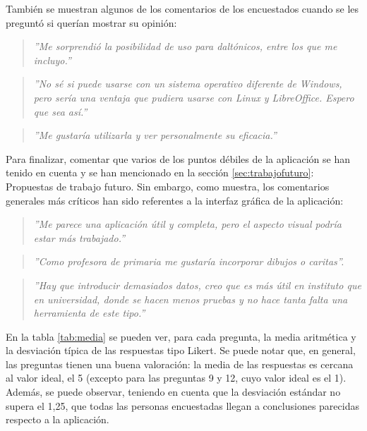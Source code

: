 También se muestran algunos de los comentarios de los encuestados cuando se les preguntó si querían mostrar su opinión:
\begin{quote}
\textit{''Me sorprendió la posibilidad de uso para daltónicos, entre los que me incluyo.''}
\end{quote}

\begin{quote}
\textit{''No sé si puede usarse con un sistema operativo diferente de Windows, pero sería una ventaja que pudiera usarse con Linux y LibreOffice. Espero que sea así.''}
\end{quote}

\begin{quote}
\textit{''Me gustaría utilizarla y ver personalmente su eficacia.''}
\end{quote}

Para finalizar, comentar que varios de los puntos débiles de la aplicación se han tenido en cuenta y se han mencionado en la sección \ref{sec:trabajofuturo}: Propuestas de trabajo futuro. Sin embargo, como muestra, los comentarios generales más críticos han sido referentes a la interfaz gráfica de la aplicación:

\begin{quote}
\textit{''Me parece una aplicación útil y completa, pero el aspecto visual podría estar más trabajado.''}
\end{quote}

\begin{quote}
\textit{''Como profesora de primaria me gustaría incorporar dibujos o caritas''.}
\end{quote}

\begin{quote}
\textit{''Hay que introducir demasiados datos, creo que es más útil en instituto que en universidad, donde se hacen menos pruebas y no hace tanta falta una herramienta de este tipo.''}
\end{quote}

En la tabla \ref{tab:media} se pueden ver, para cada pregunta, la media aritmética y la desviación típica de las respuestas tipo Likert. Se puede notar que, en general, las preguntas tienen una buena valoración: la media de las respuestas es cercana al valor ideal, el 5 (excepto para las preguntas 9 y 12, cuyo valor ideal es el 1). Además, se puede observar, teniendo en cuenta que la desviación estándar no supera el 1,25, que todas las personas encuestadas llegan a conclusiones parecidas respecto a la aplicación.


